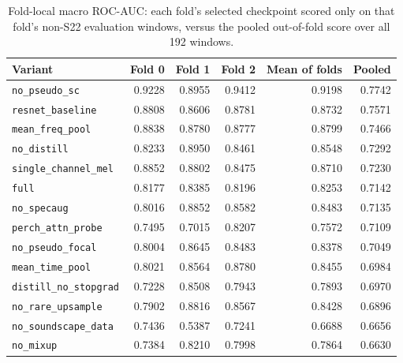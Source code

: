 \begin{table}[H]\centering\small
\caption{Fold-local macro ROC-AUC: each fold's selected checkpoint scored only on that fold's non-S22 evaluation windows, versus the pooled out-of-fold score over all 192 windows.}
\label{tab:foldlocal}
\begin{tabular}{lrrrrr}
\toprule
Variant & Fold 0 & Fold 1 & Fold 2 & Mean of folds & Pooled \\
\midrule
\texttt{no\_pseudo\_sc} & 0.9228 & 0.8955 & 0.9412 & 0.9198 & 0.7742 \\
\texttt{resnet\_baseline} & 0.8808 & 0.8606 & 0.8781 & 0.8732 & 0.7571 \\
\texttt{mean\_freq\_pool} & 0.8838 & 0.8780 & 0.8777 & 0.8799 & 0.7466 \\
\texttt{no\_distill} & 0.8233 & 0.8950 & 0.8461 & 0.8548 & 0.7292 \\
\texttt{single\_channel\_mel} & 0.8852 & 0.8802 & 0.8475 & 0.8710 & 0.7230 \\
\texttt{full} & 0.8177 & 0.8385 & 0.8196 & 0.8253 & 0.7142 \\
\texttt{no\_specaug} & 0.8016 & 0.8852 & 0.8582 & 0.8483 & 0.7135 \\
\texttt{perch\_attn\_probe} & 0.7495 & 0.7015 & 0.8207 & 0.7572 & 0.7109 \\
\texttt{no\_pseudo\_focal} & 0.8004 & 0.8645 & 0.8483 & 0.8378 & 0.7049 \\
\texttt{mean\_time\_pool} & 0.8021 & 0.8564 & 0.8780 & 0.8455 & 0.6984 \\
\texttt{distill\_no\_stopgrad} & 0.7228 & 0.8508 & 0.7943 & 0.7893 & 0.6970 \\
\texttt{no\_rare\_upsample} & 0.7902 & 0.8816 & 0.8567 & 0.8428 & 0.6896 \\
\texttt{no\_soundscape\_data} & 0.7436 & 0.5387 & 0.7241 & 0.6688 & 0.6656 \\
\texttt{no\_mixup} & 0.7384 & 0.8210 & 0.7998 & 0.7864 & 0.6630 \\
\bottomrule
\end{tabular}
\end{table}
